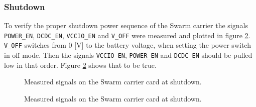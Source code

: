 \subsubsection*{Shutdown}
To verify the proper shutdown power sequence of the Swarm carrier the signals \texttt{POWER\_EN}, \texttt{DCDC\_EN}, \texttt{VCCIO\_EN} and \texttt{V\_OFF} were measured and plotted in figure \ref{fig:shutdown}.
\texttt{V\_OFF} switches from 0 [V] to the battery voltage, when setting the power switch in off mode.
Then the signals \texttt{VCCIO\_EN}, \texttt{POWER\_EN} and \texttt{DCDC\_EN} should be pulled low in that order.
Figure \ref{fig:shutdown} shows that to be true.

\begin{figure}
	\centering
    
	\caption{Measured signals on the Swarm carrier card at shutdown.}
	\label{fig:shutdown}
\end{figure}


\begin{figure}
	\centering
    
	\caption{Measured signals on the Swarm carrier card at shutdown.}
	\label{fig:shutdown}
\end{figure}



